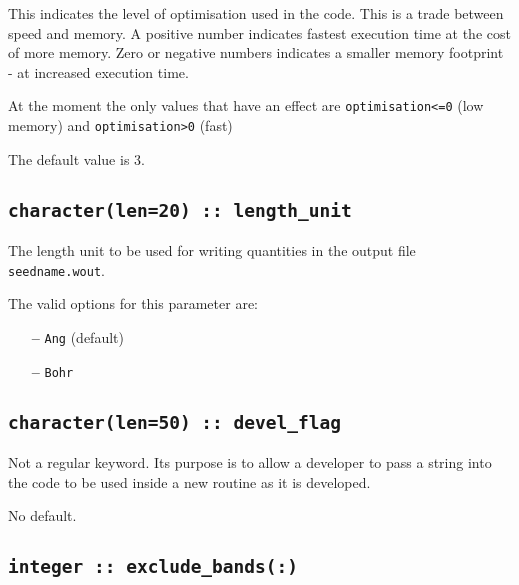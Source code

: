 This indicates the level of optimisation used in the code. This is a 
trade between speed and memory. A positive number indicates fastest execution time at the cost
of more memory. Zero or negative numbers indicates a smaller memory footprint - at increased
execution time. 

At the moment the only values that have an effect are \verb#optimisation<=0# (low memory) and \verb#optimisation>0# (fast)

The default value is 3.



\subsection[length\_unit]{\tt character(len=20) :: length\_unit}
The length unit to be used for writing quantities in the output file
{\tt seedname.wout}.

The valid options for this parameter are:
\begin{itemize}
\item[{\bf --}]  \verb#Ang# (default)
\item[{\bf --}]  \verb#Bohr#
\end{itemize}

\subsection[devel\_flag]{\tt character(len=50) :: devel\_flag}

Not a regular keyword. Its purpose is to allow a developer to pass a
string into the code to be used inside a new routine as it is developed.

No default.

%
%


\subsection[exclude\_bands]{\tt integer :: exclude\_bands(:)}

